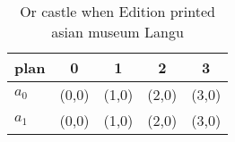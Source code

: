 \documentclass[a4paper]{article}
\begin{document}
\begin{table}
\begin{adjustbox}{width=0.7\columnwidth}
\begin{tabular}{|l|l|l|l|l|}
\hline
\textbf{plan} & \multicolumn{1}{c|}{\textbf{0}} & \multicolumn{1}{c|}{\textbf{1}} & \multicolumn{1}{c|}{\textbf{2}} & \multicolumn{1}{c|}{\textbf{3}} \\ \hline
\textbf{$a_0$}  & (0,0) & (1,0) & (2,0) & (3,0) \\ \hline
\textbf{$a_1$}  & (0,0) & (1,0) & (2,0) & (3,0) \\ \hline
\end{tabular}
\end{adjustbox}
\caption{Or castle when Edition printed asian museum Langu
}
\end{table}
\end{document}
